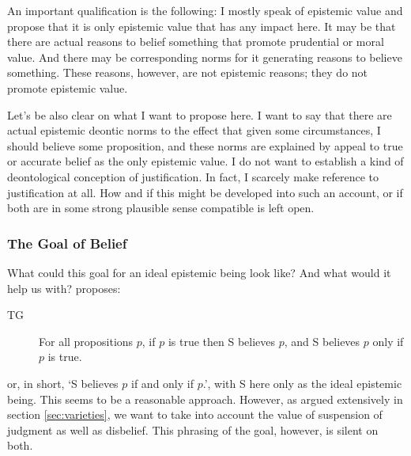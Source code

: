 \documentclass[12pt,numbers=noenddot]{scrartcl}
\begin{document}
An important qualification is the following: I mostly speak of epistemic value and propose that it is only epistemic value that has any impact here. It may be that there are actual reasons to belief something that promote prudential or moral value. And there may be corresponding norms for it generating reasons to believe something. These reasons, however, are not epistemic reasons; they do not promote epistemic value.

Let’s be also clear on what I want to propose here. I want to say that there are actual epistemic deontic norms to the effect that given some circumstances, I should believe some proposition, and these norms are explained by appeal to true or accurate belief as the only epistemic value. I do not want to establish a kind of deontological conception of justification. In fact, I scarcely make reference to justification at all. How and if this might be developed into such an account, or if both are in some strong plausible sense compatible is left open.

\subsubsection{The Goal of Belief}\label{sec:goalofbelief}

What could this goal for an ideal epistemic being look like? And what would it help us with? \textcite[157]{David2001-DAVTAT-7} proposes:

\begin{description}
    \item[TG] For all propositions $p$, if $p$ is true then S believes $p$, and S believes $p$ only if $p$ is true.
\end{description}

or, in short, ‘S believes $p$ if and only if $p$.’, with S here only as the ideal epistemic being. This seems to be a reasonable approach. However, as argued extensively in section \ref{sec:varieties}, we want to take into account the value of suspension of judgment as well as disbelief. This phrasing of the goal, however, is silent on both. 
\end{document}
